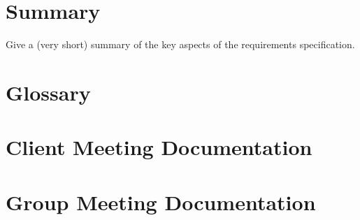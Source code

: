 \documentclass{l3deliverable}
\begin{document}
\section{Summary}

Give a (very short) summary of the key aspects of the requirements
specification.


\appendix

\section{Glossary}



\section{Client Meeting Documentation}
\label{sec:clientMeetingDocs}


\section{Group Meeting Documentation}

\end{document}
